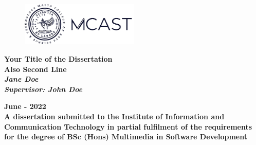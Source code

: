 \begin{titlepage}

\begin{figure}[h!]
\centering
\includegraphics[width=0.5\textwidth, right]{Figures/logo.png}
\caption*{}
\label{fig:entropy} 
\end{figure}

\vspace{0.5in}

\centering
\Huge{\textbf{Your Title of the Dissertation\\Also Second Line}}\\[2.0in]

\large{\textit{\textbf{Jane Doe}}} \\[0.2in]
\large{\textit{\textbf{Supervisor: John Doe}}} \\[0.8in]

\vspace{1.5in}

\normalsize{\textbf{June - 2022}}\\[0.2in]

\normalsize{\textbf{A dissertation submitted to the Institute of Information and Communication Technology in partial fulfilment of
the requirements for the degree of BSc (Hons) Multimedia in Software Development}}\\[0.2in]


\end{titlepage}
\newpage